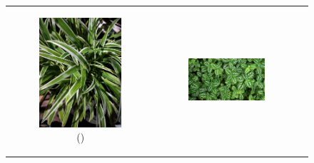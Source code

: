 \documentclass{BachelorBUI}
\begin{document}
        \begin{figure}[h]
            \centering
            \begin{tabular}{ccc}
                \begin{subfigure}{0.25\textwidth}
                    \centering
                    \includegraphics[width=\textwidth]{1_artificial_background.jpg}
                    \caption{\centering(\cite{1_artificial_background:2021})}
                \end{subfigure} &
                \begin{subfigure}{0.40\textwidth}
                    \centering
                    \includegraphics[width=\textwidth]{2_artificial_background.jpg}

\end{subfigure}
\end{tabular}
\end{figure}
\end{document}
